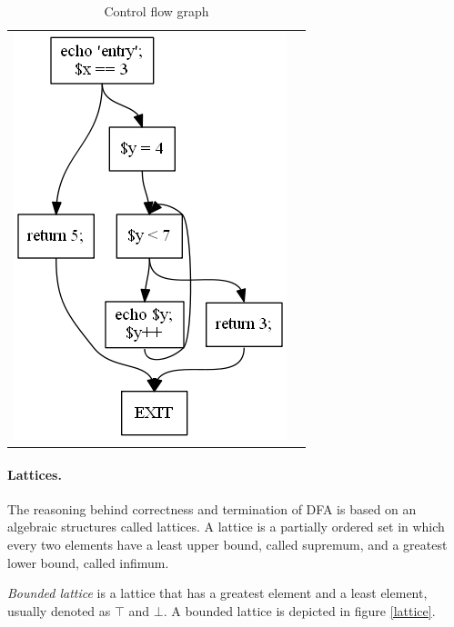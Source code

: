 \begin{table}[h]
  \begin{tabular}{ l | m{6cm} }
  \centering
    \includegraphics[scale=0.7]{img/cfg.png}
  &
 
\begin{minipage}{6cm}
%        
%
\end{minipage}

  \\
  \end{tabular}
  \caption{Control flow graph\label{cfg}}  
\end{table}          
        
        \paragraph*{Lattices.}
        The reasoning behind correctness and termination of DFA 
        is based on an algebraic structures called lattices. 
        A lattice is a partially ordered set in which every 
        two elements have a least upper bound, called supremum, 
        and a greatest lower bound, called infimum.
        
        \emph{Bounded lattice} is a lattice that has 
        a greatest element and a least element, 
        usually denoted as $\top$ and $\bot$. 
        A bounded lattice is depicted in figure \ref{lattice}.       
        
